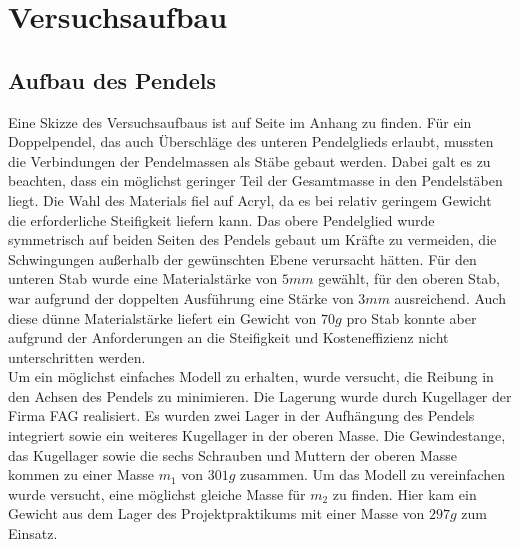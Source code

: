 \section{Versuchsaufbau}
\subsection{Aufbau des Pendels}
Eine Skizze des Versuchsaufbaus ist auf Seite 
\pageref{pic:skizze_versuchsaufbau} im Anhang zu finden.
Für ein Doppelpendel, das auch Überschläge des unteren Pendelglieds erlaubt, mussten die Verbindungen der Pendelmassen als Stäbe gebaut werden. Dabei galt es zu beachten, dass ein möglichst geringer Teil der Gesamtmasse in den Pendelstäben liegt. Die Wahl des Materials fiel auf Acryl, da es bei relativ geringem Gewicht die erforderliche Steifigkeit liefern kann. Das obere Pendelglied wurde symmetrisch auf beiden Seiten des Pendels gebaut um Kräfte zu vermeiden, die Schwingungen außerhalb der gewünschten Ebene verursacht hätten. Für den unteren Stab wurde eine Materialstärke von $5 mm$ gewählt, für den oberen Stab, war aufgrund der doppelten Ausführung eine Stärke von $3 mm$ ausreichend.
Auch diese dünne Materialstärke liefert ein Gewicht von $70  g$ pro Stab konnte aber aufgrund der Anforderungen an die Steifigkeit und Kosteneffizienz nicht unterschritten werden.\\

Um ein möglichst einfaches Modell zu erhalten, wurde versucht, die Reibung in den Achsen des Pendels zu minimieren. Die Lagerung wurde durch Kugellager der Firma FAG realisiert. Es wurden zwei Lager in der Aufhängung des Pendels integriert sowie ein weiteres Kugellager in der oberen Masse.
Die Gewindestange, das Kugellager sowie die sechs Schrauben und Muttern der oberen Masse kommen zu einer Masse $ m_1$ von $301 g$ zusammen. Um das Modell zu vereinfachen wurde versucht, eine möglichst gleiche Masse für $ m_2 $ zu finden. Hier kam ein Gewicht aus dem Lager des Projektpraktikums mit einer Masse von $297 g$ zum Einsatz.

